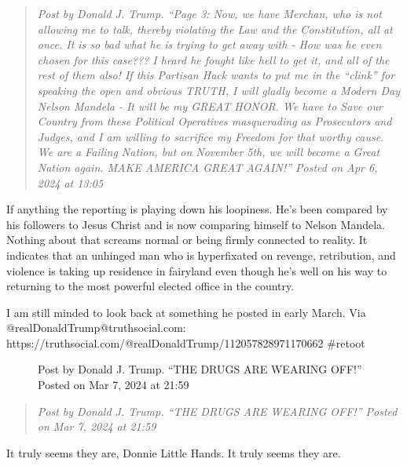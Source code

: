 \begin{quote}
\emph{Post by Donald J. Trump. ``Page 3: Now, we have Merchan, who is
not allowing me to talk, thereby violating the Law and the Constitution,
all at once. It is so bad what he is trying to get away with - How was
he even chosen for this case??? I heard he fought like hell to get it,
and all of the rest of them also! If this Partisan Hack wants to put me
in the ``clink'' for speaking the open and obvious TRUTH, I will gladly
become a Modern Day Nelson Mandela - It will be my GREAT HONOR. We have
to Save our Country from these Political Operatives masquerading as
Prosecutors and Judges, and I am willing to sacrifice my Freedom for
that worthy cause. We are a Failing Nation, but on November 5th, we will
become a Great Nation again. MAKE AMERICA GREAT AGAIN!'' Posted on Apr
6, 2024 at 13:05}
\end{quote}

If anything the reporting is playing down his loopiness. He's been
compared by his followers to Jesus Christ and is now comparing himself
to Nelson Mandela. Nothing about that screams normal or being firmly
connected to reality. It indicates that an unhinged man who is
hyperfixated on revenge, retribution, and violence is taking up
residence in fairyland even though he's well on his way to returning to
the most powerful elected office in the country.

I am still minded to look back at something he posted in early March.
Via @realDonaldTrump@truthsocial.com:
https://truthsocial.com/@realDonaldTrump/112057828971170662 \#retoot

\begin{figure}
\centering
{}
\caption{Post by Donald J. Trump. ``THE DRUGS ARE WEARING OFF!'' Posted
on Mar 7, 2024 at 21:59}
\end{figure}

\begin{quote}
\emph{Post by Donald J. Trump. ``THE DRUGS ARE WEARING OFF!'' Posted on
Mar 7, 2024 at 21:59}
\end{quote}

It truly seems they are, Donnie Little Hands. It truly seems they are.
